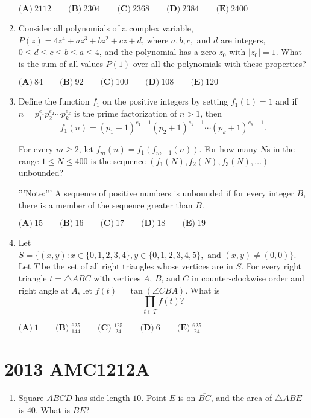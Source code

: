 \documentclass{article}
\begin{document}
\begin{enumerate}[label=\arabic*., itemsep=0.5em]
$\textbf{(A)}\ 2112\qquad\textbf{(B)}\ 2304\qquad\textbf{(C)}\ 2368\qquad\textbf{(D)}\ 2384\qquad\textbf{(E)}\ 2400$\par \vspace{0.5em}\item Consider all polynomials of a complex variable, $P(z)=4z^4+az^3+bz^2+cz+d$, where $a,b,c,$ and $d$ are integers, $0\le d\le c\le b\le a\le 4$, and the polynomial has a zero $z_0$ with $|z_0|=1.$ What is the sum of all values $P(1)$ over all the polynomials with these properties?

$\textbf{(A)}\ 84\qquad\textbf{(B)}\ 92\qquad\textbf{(C)}\ 100\qquad\textbf{(D)}\ 108\qquad\textbf{(E)}\ 120 $\par \vspace{0.5em}\item Define the function $f_1$ on the positive integers by setting $f_1(1)=1$ and if $n=p_1^{e_1}p_2^{e_2}\cdots p_k^{e_k}$ is the prime factorization of $n>1$, then 
\begin{equation*}
f_1(n)=(p_1+1)^{e_1-1}(p_2+1)^{e_2-1}\cdots (p_k+1)^{e_k-1}.
\end{equation*}

For every $m\ge 2$, let $f_m(n)=f_1(f_{m-1}(n))$. For how many $N$s in the range $1\le N\le 400$ is the sequence $(f_1(N),f_2(N),f_3(N),\dots )$ unbounded?

'''Note:''' A sequence of positive numbers is unbounded if for every integer $B$, there is a member of the sequence greater than $B$.

$\textbf{(A)}\ 15\qquad\textbf{(B)}\ 16\qquad\textbf{(C)}\ 17\qquad\textbf{(D)}\ 18\qquad\textbf{(E)}\ 19 $\par \vspace{0.5em}\item Let $S=\{(x,y) : x\in \{0,1,2,3,4\}, y\in \{0,1,2,3,4,5\},\text{ and } (x,y)\ne (0,0)\}$. 
Let $T$ be the set of all right triangles whose vertices are in $S$. For every right triangle $t=\triangle{ABC}$ with vertices $A$, $B$, and $C$ in counter-clockwise order and right angle at $A$, let $f(t)=\tan(\angle{CBA})$. What is 
\begin{equation*}
\prod_{t\in T} f(t)?
\end{equation*}


$\textbf{(A)}\ 1\qquad\textbf{(B)}\ \frac{625}{144}\qquad\textbf{(C)}\ \frac{125}{24}\qquad\textbf{(D)}\ 6\qquad\textbf{(E)}\ \frac{625}{24} $\par \vspace{0.5em}\end{enumerate}\newpage\section*{2013 AMC1212A}\begin{enumerate}[label=\arabic*., itemsep=0.5em]\item Square $ ABCD $ has side length $ 10 $. Point $ E $ is on $ \overline{BC} $, and the area of $ \bigtriangleup ABE $ is $ 40 $. What is $ BE $?


\end{enumerate}
\end{document}
